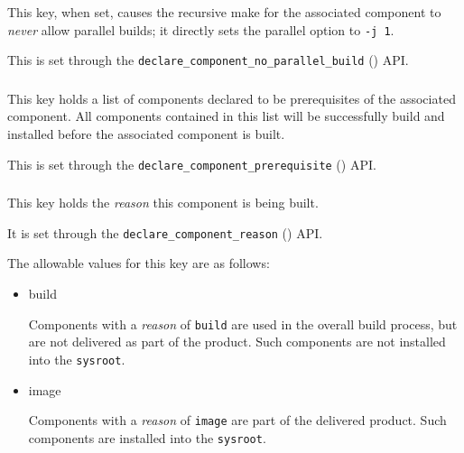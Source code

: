 This key, when set, causes the recursive make for the associated
component to \emph{never} allow parallel builds; it directly sets the
\gnumake parallel option to \texttt{-j 1}.

This is set through the
\texttt{declare\_component\_no\_parallel\_build}
() API.


\subsubsection{}

This key holds a list of components declared to be prerequisites of
the associated component.  All components contained in this list will
be successfully build and installed before the associated component is
built.

This is set through the \texttt{declare\_component\_prerequisite}
() API.

\subsubsection{}

This key holds the \emph{reason} this component is being built.

It is set through the \texttt{declare\_component\_reason}
() API.

The allowable values for this key are as follows:

\begin{itemize}
\item build

  Components with a \emph{reason} of \texttt{build} are used in the
  overall build process, but are not delivered as part of the product.
  Such components are not installed into the \texttt{sysroot}.

\item image

  Components with a \emph{reason} of \texttt{image} are part of the
  delivered product.  Such components are installed into the
  \texttt{sysroot}.

\end{itemize}
\subsubsection{}\label{lmsbwcomponent:souce-api}

